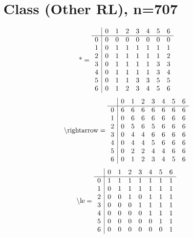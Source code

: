 \documentclass[11pt]{article}
\begin{document}
\section{Class (Other RL), n=707}
\[\text{*} = 
\begin{array}{r | r r r r r r r}
 & 0 & 1 & 2 & 3 & 4 & 5 & 6 \\ \hline
0 & 0 & 0 & 0 & 0 & 0 & 0 & 0 \\
1 & 0 & 1 & 1 & 1 & 1 & 1 & 1 \\
2 & 0 & 1 & 1 & 1 & 1 & 1 & 2 \\
3 & 0 & 1 & 1 & 1 & 1 & 3 & 3 \\
4 & 0 & 1 & 1 & 1 & 1 & 3 & 4 \\
5 & 0 & 1 & 1 & 3 & 3 & 5 & 5 \\
6 & 0 & 1 & 2 & 3 & 4 & 5 & 6 \\
\end{array}
\]
\[\text{\textbackslash rightarrow} = 
\begin{array}{r | r r r r r r r}
 & 0 & 1 & 2 & 3 & 4 & 5 & 6 \\ \hline
0 & 6 & 6 & 6 & 6 & 6 & 6 & 6 \\
1 & 0 & 6 & 6 & 6 & 6 & 6 & 6 \\
2 & 0 & 5 & 6 & 5 & 6 & 6 & 6 \\
3 & 0 & 4 & 4 & 6 & 6 & 6 & 6 \\
4 & 0 & 4 & 4 & 5 & 6 & 6 & 6 \\
5 & 0 & 2 & 2 & 4 & 4 & 6 & 6 \\
6 & 0 & 1 & 2 & 3 & 4 & 5 & 6 \\
\end{array}
\]
\[\text{\textbackslash le} = 
\begin{array}{r | r r r r r r r}
 & 0 & 1 & 2 & 3 & 4 & 5 & 6 \\ \hline
0 & 1 & 1 & 1 & 1 & 1 & 1 & 1 \\
1 & 0 & 1 & 1 & 1 & 1 & 1 & 1 \\
2 & 0 & 0 & 1 & 0 & 1 & 1 & 1 \\
3 & 0 & 0 & 0 & 1 & 1 & 1 & 1 \\
4 & 0 & 0 & 0 & 0 & 1 & 1 & 1 \\
5 & 0 & 0 & 0 & 0 & 0 & 1 & 1 \\
6 & 0 & 0 & 0 & 0 & 0 & 0 & 1 \\
\end{array}
\]
\end{document}
